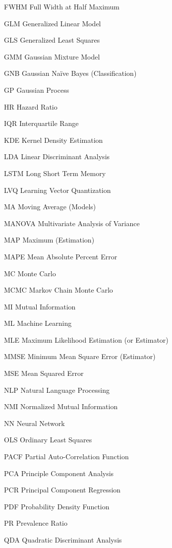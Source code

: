 \begin{symbollist}
  \item[FWHM] Full Width at Half Maximum
  \item[GLM] Generalized Linear Model
  \item[GLS] Generalized Least Squares
  \item[GMM] Gaussian Mixture Model
  \item[GNB] Gaussian N{a\"i}ve Bayes (Classification)
  \item[GP] Gaussian Process
  \item[HR] Hazard Ratio
  \item[IQR] Interquartile Range
  \item[KDE] Kernel Density Estimation
  \item[LDA] Linear Discriminant Analysis
  \item[LSTM] Long Short Term Memory
  \item[LVQ] Learning Vector Quantization
  \item[MA] Moving Average (Models)
  \item[MANOVA] Multivariate Analysis of Variance
  \item[MAP] Maximum \aposteriori (Estimation)
  \item[MAPE] Mean Absolute Percent Error
  \item[MC] Monte Carlo
  \item[MCMC] Markov Chain Monte Carlo
  \item[MI] Mutual Information
  \item[ML] Machine Learning
  \item[MLE] Maximum Likelihood Estimation (or Estimator)
  \item[MMSE] Minimum Mean Square Error (Estimator)
  \item[MSE] Mean Squared Error
  \item[NLP] Natural Language Processing
  \item[NMI] Normalized Mutual Information
  \item[NN] Neural Network
  \item[OLS] Ordinary Least Squares
  \item[PACF] Partial Auto-Correlation Function
  \item[PCA] Principle Component Analysis
  \item[PCR] Principal Component Regression
  \item[PDF] Probability Density Function
  \item[PR] Prevalence Ratio
  \item[QDA] Quadratic Discriminant Analysis

\end{symbollist}
